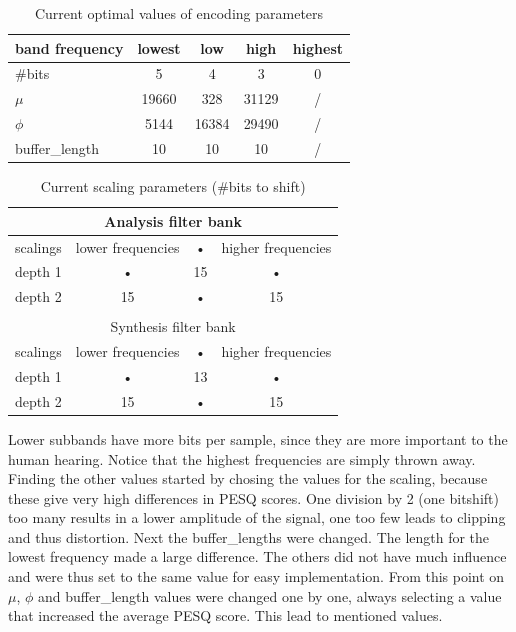 \documentclass[a4paper]{article}
\begin{document}
\begin{table}[h]
\centering
\begin{tabular}{l|cccc} 
band frequency & lowest & low & high & highest \\ 
\hline 
\#bits & 5 & 4 & 3 & 0 \\ 
$\mu$ & 19660 & 328 & 31129 & / \\  
$\phi$ & 5144 & 16384 & 29490 & / \\  
buffer\_length & 10 & 10 & 10 & / \\  
\hline 
\end{tabular}
\caption{Current optimal values of encoding parameters}
\label{tab:parametervalues}
\end{table}
\begin{table}[h]
\centering
\begin{tabular}{c|ccc}
\multicolumn{4}{c}{Analysis filter bank}\\
\hline
\hline
scalings & lower frequencies & • &  higher frequencies \\ 
\hline 
depth 1 &  • & 15 & •  \\ 
depth 2 &  15 & • & 15  \\ 
\hline 
\multicolumn{4}{c}{}\\
\multicolumn{4}{c}{Synthesis filter bank}\\
\hline 
\hline
scalings & lower frequencies & • &  higher frequencies \\ 
\hline 
depth 1 &  • & 13 & •  \\ 
depth 2 &  15 & • & 15  \\ 
\hline 
\end{tabular} 
\caption{Current scaling parameters (\#bits to shift)}
\label{tab:scalingparameters}
\end{table}
Lower subbands have more bits per sample, since they are more important to the human hearing. Notice that the highest frequencies are simply thrown away. Finding the other values started by chosing the values for the scaling, because these give very high differences in PESQ scores. One division by 2 (one bitshift) too many results in a lower amplitude of the signal, one too few leads to clipping and thus distortion. Next the buffer\_lengths were changed. The length for the lowest frequency made a large difference. The others did not have much influence and were thus set to the same value for easy implementation. From this point on $\mu$, $\phi$ and buffer\_length values were changed one by one, always selecting a value that increased the average PESQ score. This lead to mentioned values.\\
\end{document}
